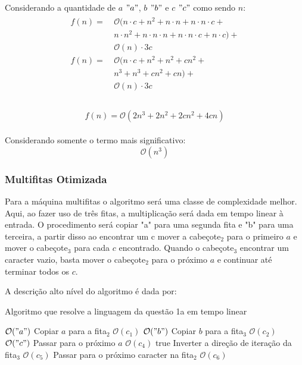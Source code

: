 \documentclass{article}
\begin{document}
Considerando a quantidade de $a$ $"a"$, $b$ $"b"$ e $c$ $"c"$ como sendo $n$:
\begin{align}
  \begin{split}
    f(n) =\ &{}  \mathcal{O}(n \cdot c + n^2 + n \cdot n + n\cdot n \cdot c + \\
                     &n\cdot n^2 + n \cdot n \cdot n + n \cdot n \cdot c + n \cdot c) +\\
                     &\mathcal{O}(n) \cdot 3c \\
    f(n) =\ &{}      \mathcal{O}(n \cdot c + n^2 + n^2 + cn^2 + \\
                     &n^3 + n^3 + cn^2 + cn) + \\
                     &\mathcal{O}(n) \cdot 3c \\
  \end{split}
\end{align}

\begin{align}
  \begin{split}
    f(n) = \mathcal{O}(2n^3 + 2n^2 + 2cn^2 + 4cn)
  \end{split}
\end{align}

Considerando somente o termo mais significativo:
$$\mathcal{O}(n^3)$$
\pagebreak

\subsubsection{Multifitas Otimizada}

Para a máquina multifitas o algoritmo será uma classe de complexidade melhor.
Aqui, ao fazer uso de três fitas, a multiplicação será dada em tempo linear à
entrada. O procedimento será copiar "a" para uma segunda fita e "b" para uma
terceira, a partir disso ao encontrar um c mover a cabeçote$_2$ para o primeiro
$a$ e mover o cabeçote$_3$ para cada $c$ encontrado. Quando o cabeçote$_3$
encontrar um caracter vazio, basta mover o cabeçote$_2$ para o próximo $a$ e
continuar até terminar todos os $c$.

A descrição alto nível do algoritmo é dada por:

\begin{algorithm} 
  \caption{Algoritmo que resolve a linguagem da questão 1a em tempo linear}
\begin{algorithmic}[1]
  \Comment $\mathcal{O}("a")$
    \State Copiar $a$ para a fita$_2$
  \Comment $\mathcal{O}(c_1)$
  \EndFor
  \Comment $\mathcal{O}("b")$
    \State Copiar $b$ para a fita$_3$
  \Comment $\mathcal{O}(c_2)$
  \EndFor
  \Comment $\mathcal{O}("c")$
  \State Passar para o próximo $a$
  \Comment $\mathcal{O}(c_4)$
    \State \Return true
  \EndIf
  \State Inverter a direção de iteração da fita$_3$
  \Comment $\mathcal{O}(c_5)$
  \EndIf
  \State Passar para o próximo caracter na fita$_2$
  \Comment $\mathcal{O}(c_6)$
  \EndFor
\end{algorithmic}
\end{algorithm}
\end{document}

